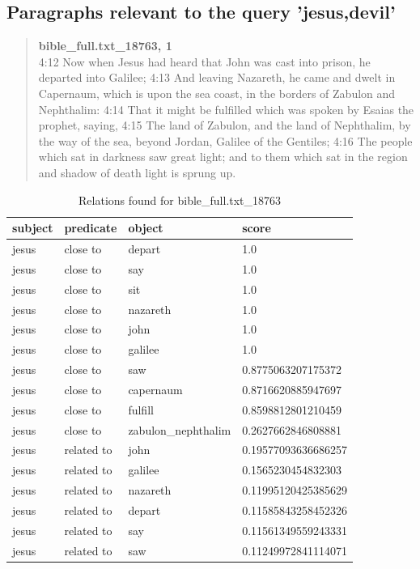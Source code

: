 \clearpage
\subsection{Paragraphs relevant to the query 'jesus,devil'}
\blockquote{
\textbf{bible\_full.txt\_18763, 1}\\
4:12 Now when Jesus had heard that John was cast into prison, he departed into Galilee; 4:13 And leaving Nazareth, he came and dwelt in Capernaum, which is upon the sea coast, in the borders of Zabulon and Nephthalim: 4:14 That it might be fulfilled which was spoken by Esaias the prophet, saying, 4:15 The land of Zabulon, and the land of Nephthalim, by the way of the sea, beyond Jordan, Galilee of the Gentiles; 4:16 The people which sat in darkness saw great light; and to them which sat in the region and shadow of death light is sprung up.}
\label{quote:jesus_devil_18763}
\begin{table}[H]
\centering
    \begin{tabular}{|l|l|l|l|}
    \hline
    subject & predicate & object & score \\
    \hline
    jesus & close to & depart & 1.0\\
    jesus &close to& say & 1.0\\
    jesus &close to& sit & 1.0\\
    jesus &close to& nazareth & 1.0\\
    jesus &close to& john & 1.0\\
    jesus &close to& galilee & 1.0\\
    jesus &close to& saw & 0.8775063207175372\\
    jesus &close to& capernaum & 0.8716620885947697\\
    jesus &close to& fulfill & 	0.8598812801210459\\
    jesus &close to& zabulon\_nephthalim & 0.2627662846808881\\
    \hline
    jesus & related to & john & 0.19577093636686257 \\
    jesus &related to & galilee & 0.1565230454832303 \\
    jesus &related to & nazareth & 0.11995120425385629 \\
    jesus &related to & depart & 0.11585843258452326 \\
    jesus &related to & say & 	0.11561349559243331 \\
    jesus &related to & saw & 	0.11249972841114071 \\
    \hline
\end{tabular}
\caption{Relations found for bible\_full.txt\_18763}
\label{tab:relations_jesus,devil_18763}
\end{table}

